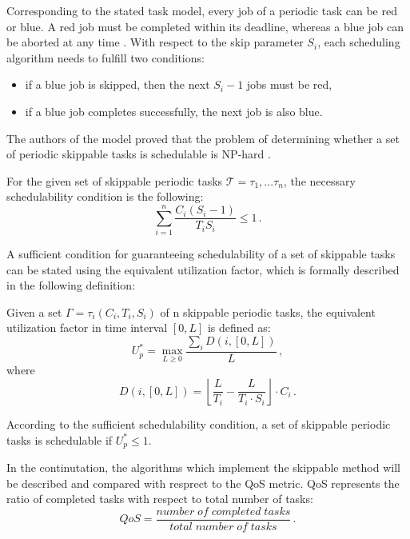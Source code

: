 Corresponding to the stated task model, every job of a periodic task can be red or blue.
A red job must be completed within its deadline, whereas a blue job can be aborted at any time 
\cite{buttazzo2011hard}. 
With respect to the skip parameter $S_i$, each scheduling algorithm needs to fulfill two conditions:
\begin{itemize}
	\item if a blue job is skipped, then the next \(S_i - 1\) jobs must be red,
	\item if a blue job completes successfully, the next job is also blue.
\end{itemize}
The authors of the model proved that the problem of determining whether a set of periodic skippable tasks is schedulable is NP-hard \cite{koren1995skip}.

For the given set of skippable periodic tasks \( \mathcal{T} = {\tau_1, ... \tau_n} \), the necessary schedulability condition is the following:
\begin{equation}
\sum_{i=1}^{n} \frac{C_i(S_i-1)}{T_i S_i} \leq 1 \, .
\end{equation}

A sufficient condition for guaranteeing schedulability of a set of skippable tasks can be stated 
using the equivalent utilization factor, which is formally described in the following definition:

\begin{mydef}
Given a set \( \Gamma = {\tau_i(C_i,T_i,S_i)} \) of n skippable periodic tasks, the equivalent utilization factor in time interval \([0,L]\) is defined as:
\begin{equation*}
U_p^\ast = \max_{L \geq 0} \frac{\sum_{i}D(i, [0,L])}{L} \, ,
\end{equation*}
where
\begin{equation*}
D(i, [0,L]) = \left\lfloor \frac{L}{T_i} - \frac{L}{T_i \cdot S_i}\right\rfloor \cdot C_i \, .
\end{equation*}
\end{mydef}

According to the sufficient schedulability condition, a set of skippable periodic tasks is schedulable if \( U_p^\ast \leq 1 \).

In the continutation, the algorithms which implement the skippable method will be described and compared with resprect to the QoS metric.
QoS represents the ratio of completed tasks with respect to total number of tasks:
\begin{equation*}
QoS = \frac{number \; of \; completed \; tasks}{total \; number \; of \; tasks} \, .
\end{equation*}


